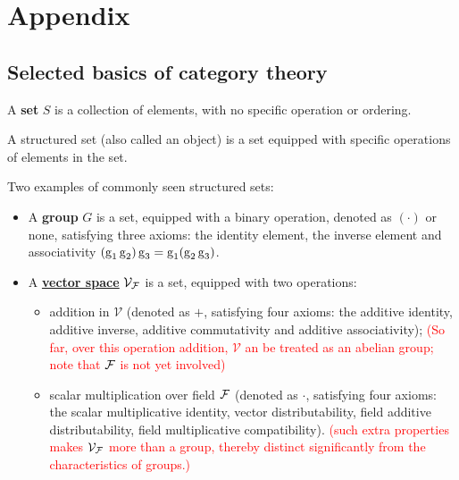 \section{Appendix}

\subsection{Selected basics of category theory}

\begin{definition} 
\label{def:set}
A \textbf{set} $S$ is a collection of elements, with no specific operation or ordering.
\end{definition}

\begin{definition} 
\label{def:structure}
A structured set (also called an object) is a set equipped with specific operations of elements in the set.
\end{definition}


\begin{example}
%
Two examples of commonly seen structured sets:
%
\begin{itemize}
    \item A \textbf{group} $G$ is a set, equipped with a binary operation, denoted as $(\cdot)$ or none, satisfying three axioms: the identity element, the inverse element and associativity $(\operatorname{g}_1\operatorname{g}_2)\operatorname{g}_3 = \operatorname{g}_1(\operatorname{g}_2\operatorname{g}_3)$.
    \item A \hyperref[def:vector-space]{\textbf{\underline{vector space}}} $\mathcal{V}_{\mathcal{F}}$ is a set, equipped with two operations:
    \begin{itemize}
        \item addition in $\mathcal{V}$ (denoted as $+$, satisfying four axioms: the additive identity, additive inverse, additive commutativity  and additive associativity); \textcolor{red}{(So far, over this operation addition, $\mathcal{V}$ an be treated as an abelian group; note that ${\mathcal{F}}$ is not yet involved)} 
        \item scalar multiplication over field ${\mathcal{F}}$ (denoted as $\cdot$, satisfying four axioms: the scalar multiplicative identity, vector distributability, field additive distributability, field multiplicative compatibility). \textcolor{red}{(such extra properties makes $\mathcal{V}_{\mathcal{F}}$ more than a group, thereby distinct significantly from the characteristics of groups.)}
    \end{itemize}
\end{itemize}
%
\end{example}


